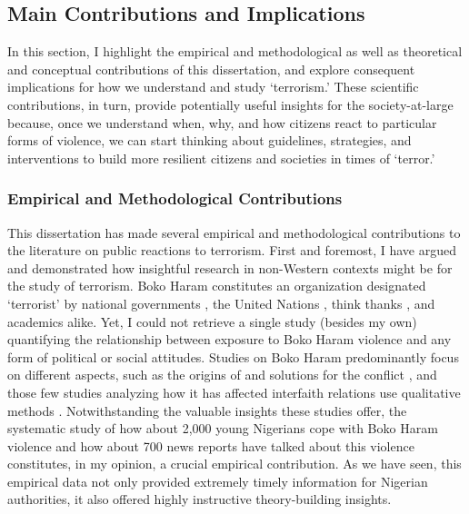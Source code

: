 \newpage
\subsection{Main Contributions and Implications}
\label{sec:612}
In this section, I highlight the empirical and methodological as well as theoretical and conceptual contributions of this dissertation, and explore consequent implications for how we understand and study `terrorism.' These scientific contributions, in turn, provide potentially useful insights for the society-at-large because, once we understand when, why, and how citizens react to particular forms of violence, we can start thinking about guidelines, strategies, and interventions to build more resilient citizens and societies in times of `terror.'

\subsubsection{Empirical and Methodological Contributions}
This dissertation has made several empirical and methodological contributions to the literature on public reactions to terrorism. First and foremost, I have argued and demonstrated how insightful research in non-Western contexts might be for the study of terrorism. Boko Haram constitutes an organization designated `terrorist' by national governments \cite[e.g.,][]{Canada2013, USState2020}, the United Nations \citep{UNSC2014}, think thanks \citep[e.g.,][p. 4]{InstituteforEconomics&Peace2015}, and academics \citep[e.g.,][]{Aghedo2012, Godefroidt2018a} alike. Yet, I could not retrieve a single study (besides my own) quantifying the relationship between exposure to Boko Haram violence and any form of political or social attitudes. Studies on Boko Haram predominantly focus on different aspects, such as the origins of and solutions for the conflict \citep[e.g.,][]{Onuoha2010, Iyekekpolo2016a, Mustapha2014b, Aghedo2013}, and those few studies analyzing how it has affected interfaith relations use qualitative methods \citep[e.g.,][]{Onapajo2015}. Notwithstanding the valuable insights these studies offer, the systematic study of how about 2,000 young Nigerians cope with Boko Haram violence and how about 700 news reports have talked about this violence constitutes, in my opinion, a crucial empirical contribution. As we have seen, this empirical data not only provided extremely timely information for Nigerian authorities, it also offered highly instructive theory-building insights. 


